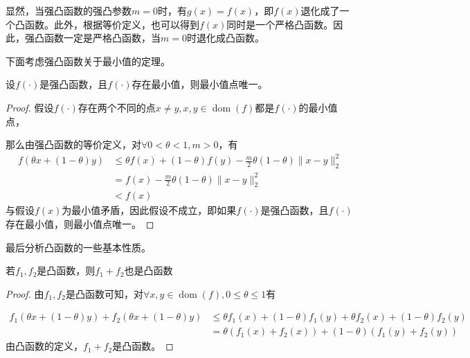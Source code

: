 显然，当强凸函数的强凸参数$m=0$时，有$g(x)=f(x)$，即$f(x)$退化成了一个凸函数。此外，根据等价定义，也可以得到$f(x)$同时是一个严格凸函数。因此，强凸函数一定是严格凸函数，当$m=0$时退化成凸函数。

下面考虑强凸函数关于最小值的定理。

\begin{theorem}
    设$f(\cdot)$是强凸函数，且$f(\cdot)$存在最小值，则最小值点唯一。
\end{theorem}
\begin{proof}
    假设$f(\cdot)$存在两个不同的点$x\neq y, x, y\in \mathop{\mathrm{dom}} (f)$都是$f(\cdot)$的最小值点，

    那么由强凸函数的等价定义，对$\forall 0<\theta<1, m>0$，有
    \begin{equation*}
        \begin{split}
            f(\theta x + (1-\theta)y) &\leq \theta f(x) + (1-\theta)f(y) - \frac{m}{2}\theta(1-\theta)\|x-y\|_{2}^{2} \\
            &= f(x) - \frac{m}{2}\theta(1-\theta)\|x-y\|_{2}^{2} \\
            &< f(x)
        \end{split}
    \end{equation*}
    与假设$f(x)$为最小值矛盾，因此假设不成立，即如果$f(\cdot)$是强凸函数，且$f(\cdot)$存在最小值，则最小值点唯一。
\end{proof}

最后分析凸函数的一些基本性质。
\begin{theorem}
    若$f_{1}, f_{2}$是凸函数，则$f_{1}+f_{2}$也是凸函数
\end{theorem}
\begin{proof}
    由$f_{1}, f_{2}$是凸函数可知，对$\forall x, y\in \mathop{\mathrm{dom}} (f), 0\leq \theta \leq 1$有

    \begin{equation*}
        \begin{split}
            f_{1}(\theta x+(1-\theta)y)+f_{2}(\theta x+(1-\theta)y) &\leq \theta f_{1}(x)+(1-\theta)f_{1}(y) + \theta f_{2}(x)+(1-\theta)f_{2}(y) \\
            &=\theta(f_{1}(x)+f_{2}(x)) + (1-\theta)(f_{1}(y)+f_{2}(y))
        \end{split}
    \end{equation*}
    由凸函数的定义，$f_{1}+f_{2}$是凸函数。
\end{proof}

